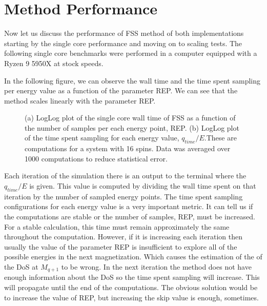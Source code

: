 \section{Method Performance}

	Now let us discuss the performance of FSS method of both implementations starting by the single core performance and moving on to scaling tests. The following single core benchmarks were performed in a computer equipped with a Ryzen 9 5950X at stock speeds.  
	
	In the following figure, we can observe the wall time and the time spent sampling per energy value as a function of the parameter REP. We can see that the method scales linearly with the parameter REP. 
	
\begin{figure}[ht]
\centering
{}
\quad
\quad
\quad
{}	

\caption{(a) LogLog plot of the single core wall time of FSS as a function of the number of samples per each energy point, REP.  (b) LogLog plot of the time spent sampling for each energy value, $q_{time}/E$.These are computations for a system with 16 spins. Data was averaged over 1000 computations to reduce statistical error.}
\end{figure}

Each iteration of the simulation there is an output to the terminal where the $q_{time}/E$ is given. This value is computed by dividing the wall time spent on that iteration by the number of sampled energy points. 
The time spent sampling configurations for each energy value is a very important metric. It can tell us if the computations are stable or the number of samples, REP, must be increased. 
For a stable calculation, this time must remain approximately the same throughout the computation. However, if it is increasing each iteration then usually the value of the parameter REP is insufficient to explore all of the possible energies in the next magnetization. Which causes the estimation of the of the DoS at $M_{q+1}$ to be wrong. In the next iteration the method does not have enough information about the DoS so the time spent sampling will increase. This will propagate until the end of the computations. The obvious solution would be to increase the value of REP, but increasing the skip value is enough, sometimes.

